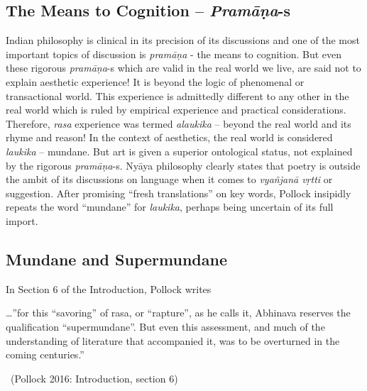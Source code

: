 \vspace{-0.3cm}

\subsection*{The Means to Cognition – \textit{Pramāṇa}-s}

\vspace{-0.3cm}

Indian philosophy is clinical in its precision of its discussions and one of the most important topics of discussion is \textit{pramāṇa} - the means to cognition. But even these rigorous \textit{pramāṇa}-s which are valid in the real world we live, are said not to explain aesthetic experience! It is beyond the logic of phenomenal or transactional world. This experience is admittedly different to any other in the real world which is ruled by empirical experience and practical considerations. Therefore, \textit{rasa} experience was termed \textit{alaukika} – beyond the real world and its rhyme and reason! In the context of aesthetics, the real world is considered \textit{laukika} – mundane. But art is given a superior ontological status, not explained by the rigorous \textit{pramāṇa}-s. Nyāya philosophy clearly states that poetry is outside the ambit of its discussions on language when it comes to \textit{vyañjanā vṛtti} or suggestion. After promising “fresh translations” on key words, Pollock insipidly repeats the word “mundane” for \textit{laukika}, perhaps being uncertain of its full import.


\subsection*{Mundane and Supermundane}

In Section 6 of the Introduction, Pollock writes

\begin{myquote}
…”for this “savoring” of rasa, or “rapture”, as he calls it, Abhinava reserves the qualification “supermundane”. But even this assessment, and much of the understanding of literature that accompanied it, was to be overturned in the coming centuries.” 

~\hfill (Pollock 2016: Introduction, section 6)
\end{myquote}

